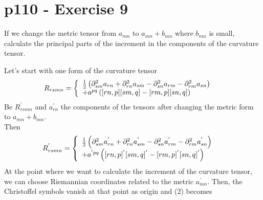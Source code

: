 \section{p110 - Exercise 9}
\begin{tcolorbox}
If we change the metric tensor  from $a_{mn}$ to $a_{mn}+b_{mn}$  where $b_{mn}$ is small, calculate the principal parts of the increment in the components of the curvature tensor.
\end{tcolorbox}
Let's start with one form of the curvature tensor
\begin{align}
R_{rsmn} &= \left\{\begin{array}{l}\frac{1}{2}\left(\partial^2_{sm} a_{rn}+\partial^2_{rn} a_{sm}-\partial^2_{sn} a_{rm}-\partial^2_{rm} a_{sn}\right) \\
+ a^{pq}\left([rn,p][sm,q] - [rm,p][sn,q]\right)\end{array}\right.
\end{align}
Be $R_{rsmn}^{'}$ and $a^{'}_{rn}$ the components of the tensors after changing the metric form to $a_{mn}+b_{mn}$.\\
Then
\begin{align}
R_{rsmn}^{'} &= \left\{\begin{array}{l} \frac{1}{2}\left(\partial^2_{sm} a^{'}_{rn}+\partial^2_{rn} a^{'}_{sm}-\partial^2_{sn} a^{'}_{rm}-\partial^2_{rm} a^{'}_{sn}\right) \\
+ a^{'pq}\left([rn,p]^{'}[sm,q]^{'} - [rm,p]^{'}[sn,q]^{'}\right)\end{array}\right.
\end{align}
At the point where we want to calculate the increment of the curvature tensor, we can choose Riemannian coordinates related to the metric $a^{'}_{mn}$. Then, the Christoffel symbols vanish at that point as origin  and (2) becomes
